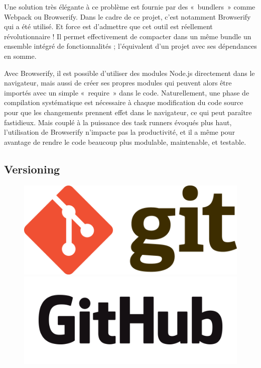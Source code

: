 \documentclass[a4paper,12pt]{article}
\begin{document}
Une solution très élégante à ce problème est fournie par des «~bundlers~» comme Webpack ou Browserify. Dans le cadre de ce projet, c'est notamment Browserify qui a été utilisé. Et force est d'admettre que cet outil est réellement révolutionnaire ! Il permet effectivement de compacter dans un même bundle un ensemble intégré de fonctionnalités ; l'équivalent d'un projet avec ses dépendances en somme.

Avec Browserify, il est possible d'utiliser des modules Node.js directement dans le navigateur, mais aussi de créer ses propres modules qui peuvent alors être importés avec un simple «~require~» dans le code. Naturellement, une phase de compilation systématique est nécessaire à chaque modification du code source pour que les changements prennent effet dans le navigateur, ce qui peut paraître fastidieux. Mais couplé à la puissance des task runners évoqués plus haut, l'utilisation de Browserify n'impacte pas la productivité, et il a même pour avantage de rendre le code beaucoup plus modulable, maintenable, et testable.

\subsection{Versioning}

\begin{figure}[!h]
  \begin{center}
    \includegraphics[scale=0.15]{logo-git.png}
    \includegraphics[scale=0.15]{logo-github.png}
  \end{center}
\end{figure}
\end{document}
